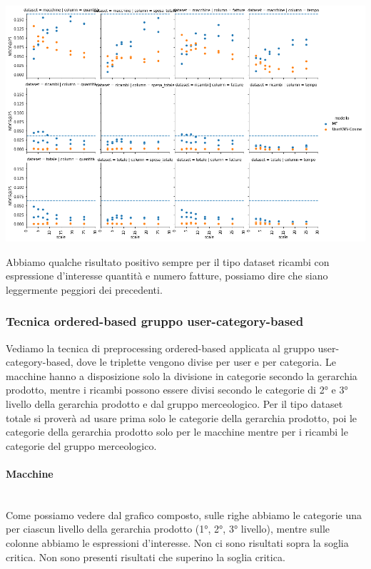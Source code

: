\includegraphics[width=16cm]{figures/risultati_ordered_singolo.png}

Abbiamo qualche risultato positivo sempre per il tipo dataset ricambi con espressione d'interesse quantità e numero fatture, possiamo dire che siano leggermente peggiori dei precedenti.
\newpage

\subsubsection{Tecnica ordered-based gruppo user-category-based}
Vediamo la tecnica di preprocessing ordered-based applicata al gruppo user-category-based, dove le triplette vengono divise per user e per categoria.
Le macchine hanno a disposizione solo la divisione in categorie secondo la gerarchia prodotto, mentre i ricambi possono essere divisi secondo le categorie di 2° e 3° livello della gerarchia prodotto e dal gruppo merceologico. Per il tipo dataset totale si proverà ad usare prima solo le categorie della gerarchia prodotto, poi le categorie della gerarchia prodotto solo per le macchine mentre per i ricambi le categorie del gruppo merceologico.
\paragraph{Macchine}\mbox{} \\
Come possiamo vedere dal grafico composto, sulle righe abbiamo le categorie una per ciascun livello della gerarchia prodotto (1°, 2°, 3° livello), mentre sulle colonne abbiamo le espressioni d'interesse. Non ci sono risultati sopra la soglia critica. Non sono presenti risultati che superino la soglia critica.\\

